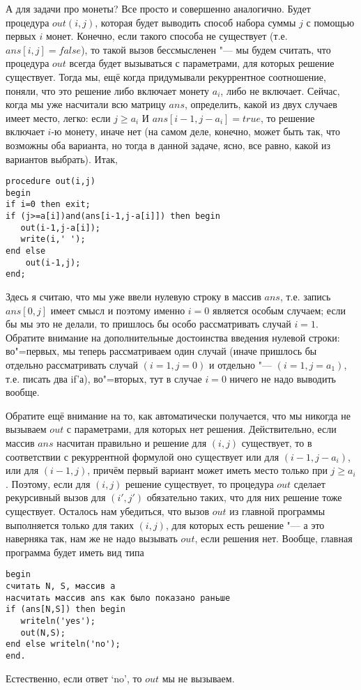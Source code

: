 А для задачи про монеты? Все просто и совершенно аналогично. Будет процедура $out(i,j)$, которая будет выводить способ набора суммы $j$ с помощью первых $i$ монет. Конечно, если такого способа не существует (т.е. $ans[i,j]=false$), то такой вызов бессмысленен "--- мы будем считать, что процедура $out$ всегда будет вызываться с параметрами, для которых решение существует. Тогда мы, ещё когда придумывали рекуррентное соотношение, поняли, что это решение либо включает монету $a_i$, либо не включает. Сейчас, когда мы уже насчитали всю матрицу $ans$, определить, какой из двух случаев имеет место, легко: если $j\geq a_i$ И $ans[i-1,j-a_i]=true$, то решение включает $i$-ю монету, иначе нет (на самом деле, конечно, может быть так, что возможны оба варианта, но тогда в данной задаче, ясно, все равно, какой из вариантов выбрать). Итак,
\begin{codesampleo}\begin{verbatim}
procedure out(i,j)
begin
if i=0 then exit;
if (j>=a[i])and(ans[i-1,j-a[i]]) then begin
   out(i-1,j-a[i]);
   write(i,' ');
end else 
    out(i-1,j);
end;
\end{verbatim}
\end{codesampleo}
\label{coins_out}
Здесь я считаю, что мы уже ввели нулевую строку в массив $ans$, т.е. запись $ans[0,j]$ имеет смысл и поэтому именно $i=0$ является особым случаем; если бы мы это не делали, то пришлось бы особо рассматривать случай $i=1$. Обратите внимание на дополнительные достоинства введения нулевой строки: во"=первых, мы теперь рассматриваем один случай (иначе пришлось бы отдельно рассматривать случай $(i=1,j=0)$ и отдельно "--- $(i=1,j=a_1)$, т.е. писать два if'а), во"=вторых, тут в случае $i=0$ ничего не надо выводить вообще.

Обратите ещё внимание на то, как автоматически получается, что мы никогда не вызываем $out$ с параметрами, для которых нет решения. Действительно, если массив $ans$ насчитан правильно и решение для $(i,j)$ существует, то в соответствии с рекуррентной формулой оно существует или для $(i-1,j-a_i)$, или для $(i-1,j)$, причём первый вариант может иметь место только при $j\geq a_i$. Поэтому, если для $(i,j)$ решение существует, то процедура $out$ сделает рекурсивный вызов для $(i',j')$ обязательно таких, что для них решение тоже существует. Осталось нам убедиться, что вызов $out$ из главной программы выполняется только для таких $(i,j)$, для которых есть решение "--- а это наверняка так, нам же не надо вызывать $out$, если решения нет. Вообще, главная программа будет иметь вид типа
\begin{codesampleo}\begin{verbatim}
begin
считать N, S, массив a
насчитать массив ans как было показано раньше
if (ans[N,S]) then begin
   writeln('yes');
   out(N,S);
end else writeln('no');
end.
\end{verbatim}
\end{codesampleo}
Естественно, если ответ `no', то $out$ мы не вызываем.

